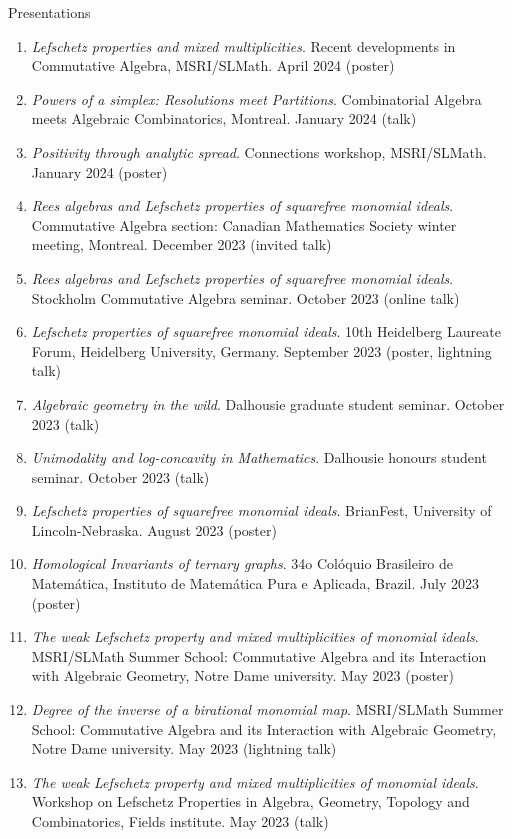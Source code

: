 \documentclass[12pt]{resume} %
\begin{document}
\begin{rSection}{Presentations}
\begin{enumerate}
        \item \textit{Lefschetz properties and mixed multiplicities}. Recent developments in Commutative Algebra, MSRI/SLMath. April 2024 (poster)
        \item \textit{Powers of a simplex: Resolutions meet Partitions}. Combinatorial Algebra meets Algebraic Combinatorics, Montreal. January 2024 (talk)
        \item \textit{Positivity through analytic spread}. Connections workshop, MSRI/SLMath. January 2024 (poster)
        \item \textit{Rees algebras and Lefschetz properties of squarefree monomial ideals}. Commutative Algebra section: Canadian Mathematics Society winter meeting, Montreal. December 2023 (invited talk)
        \item \textit{Rees algebras and Lefschetz properties of squarefree monomial ideals}. Stockholm Commutative Algebra seminar. October 2023 (online talk)
        \item \textit{Lefschetz properties of squarefree monomial ideals}. 10th Heidelberg Laureate Forum, Heidelberg University, Germany. September 2023 (poster, lightning talk)
        \item \textit{Algebraic geometry in the wild}. Dalhousie graduate student seminar. October 2023 (talk)
        \item \textit{Unimodality and log-concavity in Mathematics}. Dalhousie honours student seminar. October 2023 (talk)
        \item \textit{Lefschetz properties of squarefree monomial ideals}. BrianFest, University of Lincoln-Nebraska. August 2023 (poster)
        \item \textit{Homological Invariants of ternary graphs}. 34o Colóquio Brasileiro de Matemática, Instituto de Matemática Pura e Aplicada, Brazil. July 2023 (poster)
        \item \textit{The weak Lefschetz property and mixed multiplicities of monomial ideals}. MSRI/SLMath Summer School: Commutative Algebra and its Interaction with Algebraic Geometry, Notre Dame university. May 2023 (poster)
        \item \textit{Degree of the inverse of a birational monomial map}. MSRI/SLMath Summer School: Commutative Algebra and its Interaction with Algebraic Geometry, Notre Dame university. May 2023 (lightning talk)
        \item \textit{The weak Lefschetz property and mixed multiplicities of monomial ideals}. Workshop on Lefschetz Properties in Algebra, Geometry, Topology and Combinatorics, Fields institute. May 2023 (talk)

\end{enumerate}
\end{rSection}
\end{document}
